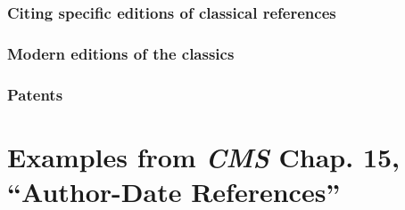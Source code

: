 \documentclass[11pt,letterpaper,oneside]{article}
\begin{document}
\setcounter{subsubsection}{245}
\subsubsection{Citing specific editions of classical references}

\begin{citebib}
\item \cite{epictetus1916}
\end{citebib}

\setcounter{subsubsection}{250}
\subsubsection{Modern editions of the classics}

\begin{citebib}
\item \cite{aristotle1983}
\item \cite{maimonides1965}
\end{citebib}

\setcounter{subsubsection}{257}
\subsubsection{Patents}

\begin{citebib}
\item \cite{iizuka1986}
\end{citebib}



\section{Examples from \emph{CMS} Chap. 15, ``Author-Date
References''}
\label{paren}
\end{document}
